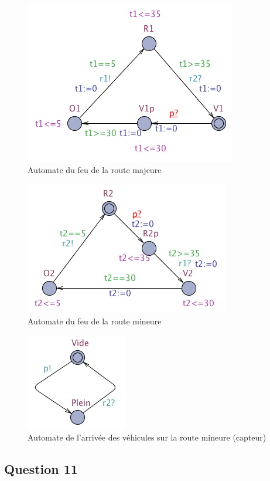 \documentclass[11pt]{article}
\begin{document}
\begin{figure}[H]
	\centering
	\includegraphics{ressources/part3/Q10-1.png}
	\caption{Automate du feu de la route majeure}
\end{figure}

\begin{figure}[H]
	\centering
	\includegraphics{ressources/part3/Q10-2.png}
	\caption{Automate du feu de la route mineure}
\end{figure}

\begin{figure}[H]
	\centering
	\includegraphics{ressources/part3/Q10-3.png}
	\caption{Automate de l'arrivée des véhicules sur la route mineure (capteur)}
\end{figure}

\subsection{Question 11}\label{question-11}
\end{document}
